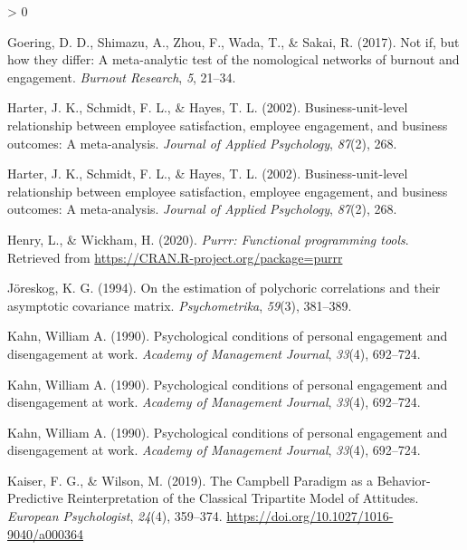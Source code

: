 \documentclass[
  english,
  man]{apa6}
\newlength{\cslhangindent}
\newenvironment{CSLReferences}[2] %
 {%
  \setlength{\parindent}{0pt}
  \ifodd #1 \everypar{\setlength{\hangindent}{\cslhangindent}}\ignorespaces\fi
  \ifnum #2 > 0
  \setlength{\parskip}{#2\baselineskip}
  \fi
 }%
 {}
\begin{document}
\begin{CSLReferences}{1}{0}
\leavevmode\hypertarget{ref-goering2017not}{}%
Goering, D. D., Shimazu, A., Zhou, F., Wada, T., \& Sakai, R. (2017). Not if, but how they differ: A meta-analytic test of the nomological networks of burnout and engagement. \emph{Burnout Research}, \emph{5}, 21--34.

\leavevmode\hypertarget{ref-harter_business-unit-level_2002}{}%
Harter, J. K., Schmidt, F. L., \& Hayes, T. L. (2002). Business-unit-level relationship between employee satisfaction, employee engagement, and business outcomes: A meta-analysis. \emph{Journal of Applied Psychology}, \emph{87}(2), 268.

\leavevmode\hypertarget{ref-harter_business-unit-level_2002}{}%
Harter, J. K., Schmidt, F. L., \& Hayes, T. L. (2002). Business-unit-level relationship between employee satisfaction, employee engagement, and business outcomes: A meta-analysis. \emph{Journal of Applied Psychology}, \emph{87}(2), 268.

\leavevmode\hypertarget{ref-R-purrr}{}%
Henry, L., \& Wickham, H. (2020). \emph{Purrr: Functional programming tools}. Retrieved from \url{https://CRAN.R-project.org/package=purrr}

\leavevmode\hypertarget{ref-joreskog1994estimation}{}%
Jöreskog, K. G. (1994). On the estimation of polychoric correlations and their asymptotic covariance matrix. \emph{Psychometrika}, \emph{59}(3), 381--389.

\leavevmode\hypertarget{ref-kahn_psychological_1990}{}%
Kahn, William A. (1990). Psychological conditions of personal engagement and disengagement at work. \emph{Academy of Management Journal}, \emph{33}(4), 692--724.

\leavevmode\hypertarget{ref-kahn1990psychological}{}%
Kahn, William A. (1990). Psychological conditions of personal engagement and disengagement at work. \emph{Academy of Management Journal}, \emph{33}(4), 692--724.

\leavevmode\hypertarget{ref-kahn_psychological_1990}{}%
Kahn, William A. (1990). Psychological conditions of personal engagement and disengagement at work. \emph{Academy of Management Journal}, \emph{33}(4), 692--724.

\leavevmode\hypertarget{ref-kaiser_campbell_2019}{}%
Kaiser, F. G., \& Wilson, M. (2019). The {Campbell} {Paradigm} as a {Behavior}-{Predictive} {Reinterpretation} of the {Classical} {Tripartite} {Model} of {Attitudes}. \emph{European Psychologist}, \emph{24}(4), 359--374. \url{https://doi.org/10.1027/1016-9040/a000364}


\end{CSLReferences}
\end{document}
